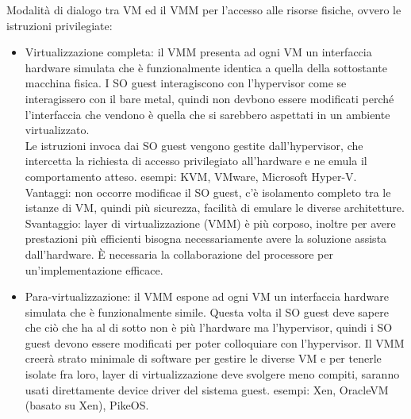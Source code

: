 \documentclass[16px]{article}
\begin{document}
Modalità di dialogo tra VM ed il VMM per l'accesso alle risorse fisiche, ovvero le istruzioni privilegiate:
\begin{itemize}
\item Virtualizzazione completa: il VMM presenta ad ogni VM un interfaccia hardware simulata che è funzionalmente identica a quella della sottostante macchina fisica. I SO guest interagiscono con l'hypervisor come se interagissero con il bare metal, quindi non devbono essere modificati perché l'interfaccia che vendono è quella che si sarebbero aspettati in un ambiente virtualizzato.\\ Le istruzioni invoca dai SO guest vengono gestite dall'hypervisor, che intercetta la richiesta di accesso privilegiato all'hardware e ne emula il comportamento atteso. esempi: KVM, VMware, Microsoft Hyper-V. Vantaggi: non occorre modificae il SO guest, c'è isolamento completo tra le istanze di VM, quindi più sicurezza, facilità di emulare le diverse architetture. Svantaggio: layer di virtualizzazione (VMM) è più corposo, inoltre per avere prestazioni più efficienti bisogna necessariamente avere la soluzione assista dall'hardware. È necessaria la collaborazione del processore per un'implementazione efficace.
\item Para-virtualizzazione: il VMM espone ad ogni VM un interfaccia hardware simulata che è funzionalmente simile. Questa volta il SO guest deve sapere che ciò che ha al di sotto non è più l'hardware ma l'hypervisor, quindi i SO guest devono essere modificati per poter colloquiare con l'hypervisor. Il VMM creerà strato minimale di software per gestire le diverse VM e per tenerle isolate fra loro, layer di virtualizzazione deve svolgere meno compiti, saranno usati direttamente device driver del sistema guest. esempi: Xen, OracleVM (basato su Xen), PikeOS.
\end{itemize}
\end{document}
